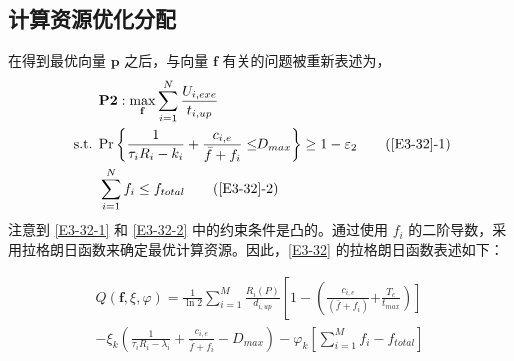 \subsection{计算资源优化分配}\label{section3-3-4}
在得到最优向量 $\mathbf{p}$ 之后，与向量 $\mathbf{f}$ 有关的问题被重新表述为，
\begin{align}
& \textbf{P2}:\max\limits_{\mathbf{f}}\sum_{i=1}^{N}\frac{U_{i,exe}}{t_{i,up}}                                     \label{E3-32}\\
\text { s.t. }
& \textrm{Pr}\left\{\frac{1}{\tau_iR_i-k_i}+\frac{c_{i,e}}{\bar{f}+f_i}\le \!\!D_{max}\right\}\geq1-\varepsilon_2  \tag{\ref{E3-32}{-1}} \label{E3-32-1}\\  %
& \sum_{i=1}^{N}f_i\le f_{total}                                                                                   \tag{\ref{E3-32}{-2}} \label{E3-32-2}  %
\end{align}
注意到 \eqref{E3-32-1} 和 \eqref{E3-32-2} 中的约束条件是凸的。通过使用 $f_i$ 的二阶导数，采用拉格朗日函数来确定最优计算资源。因此，\eqref{E3-32} 的拉格朗日函数表述如下：

\begin{equation}\label{E33}
\begin{aligned}
Q\left(\mathbf{f},\xi,\varphi\right)=\frac{1}{\ln{2}}\sum_{i=1}^{M}\frac{R_i\left(P\right)}{ d_{i,up}}
\left[1-
\left(\frac{c_{i,e}}{\phantom{}\left(\bar{f}+f_i\right)}
\right.\right.
\left.\left.
+\frac{T_c}{t_{max}}
\right)
\right]\\
-\xi_k\left(\frac{1}{\tau_iR_i-\lambda_i}+\frac{c_{i,e}}{\bar{f}+f_i}-D_{max}\right)
-\varphi_k\left[\sum_{i=1}^{M}f_i-f_{total}\right]
\end{aligned}
\end{equation}
